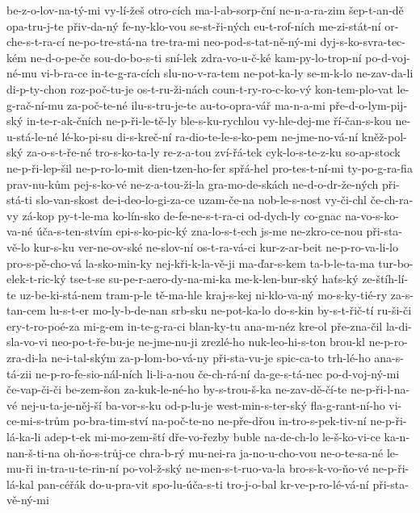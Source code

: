 be-z-o-lov-na-tý-mi
vy-lí-žeš
otro-cích
ma-l-ab-sorp-ční
ne-n-a-ra-zim
šep-t-an-dě
opa-tru-j-te
přiv-da-ný
fe-ny-klo-vou
se-st-ři-ných
eu-t-rof-ních
me-zi-stát-ní
or-che-s-t-ra-cí
ne-po-tre-stá-na
tre-tra-mi
neo-pod-s-tat-ně-ný-mi
dyj-s-ko-svra-tec-kém
ne-d-o-pe-če
sou-do-bo-s-ti
sní-lek
zdra-vo-u-č-ké
kam-py-lo-trop-ní
po-d-voj-né-mu
vi-b-ra-ce
in-te-g-ra-cích
slu-no-v-ra-tem
ne-pot-ka-ly
se-m-k-lo
ne-zav-da-li
di-p-ty-chon
roz-poč-tu-je
os-t-ru-ži-nách
coun-t-ry-ro-c-ko-vý
kon-tem-plo-vat
le-g-rač-ní-mu
za-poč-te-né
ilu-s-tru-je-te
au-to-opra-vář
ma-n-a-mi
pře-d-o-lym-pij-ský
in-te-r-ak-čních
ne-p-ři-le-tě-ly
ble-s-ku-rychlou
vy-hle-dej-me
ří-čan-s-kou
ne-u-stá-le-né
lé-ko-pi-su
di-s-kreč-ní
ra-dio-te-le-s-ko-pem
ne-jme-no-vá-ní
kněž-pol-ský
za-o-s-t-ře-né
tro-s-ko-ta-ly
re-z-a-tou
zví-řá-tek
cyk-lo-s-te-z-ku
so-ap-stock
ne-p-ři-lep-šil
ne-p-ro-lo-mit
dien-tzen-ho-fer
spřá-hel
pro-tes-t-ní-mi
ty-po-g-ra-fia
prav-nu-kům
pej-s-ko-vé
ne-z-a-tou-ži-la
gra-mo-de-skách
ne-d-o-dr-že-ných
při-stá-ti
slo-van-skost
de-i-deo-lo-gi-za-ce
uzam-če-na
nob-le-s-nost
vy-či-chl
če-ch-ra-vy
zá-kop
py-t-le-ma
ko-lín-sko
de-fe-ne-s-t-ra-ci
od-dych-ly
co-gnac
na-vo-s-ko-va-né
úča-s-ten-stvím
epi-s-ko-pic-ký
zna-lo-s-t-ech
js-me
ne-zkro-ce-nou
při-sta-vě-lo
kur-s-ku
ver-ne-ov-ské
ne-slov-ní
os-t-ra-vá-ci
kur-z-ar-beit
ne-p-ro-va-li-lo
pro-s-pě-cho-vá
la-sko-min-ky
nej-kři-k-la-vě-ji
ma-ďar-s-kem
ta-b-le-ta-ma
tur-bo-elek-t-ric-ký
tse-t-se
su-pe-r-aero-dy-na-mi-ka
me-k-len-bur-ský
haťs-ký
ze-štíh-lí-te
uz-be-ki-stá-nem
tram-p-le
tě-ma-hle
kraj-s-kej
ni-klo-va-ný
mo-s-ky-tié-ry
za-s-tan-cem
lu-s-t-er
mo-ly-b-de-nan
srb-sku
ne-pot-ka-lo
do-s-kin
by-s-t-řič-tí
ru-ši-či
ery-t-ro-poé-za
mi-g-em
in-te-g-ra-ci
blan-ky-tu
ana-m-néz
kre-ol
pře-zna-čil
la-di-sla-vo-vi
neo-po-t-ře-bu-je
ne-jme-nu-ji
zrezlé-ho
nuk-leo-hi-s-ton
brou-kl
ne-p-ro-zra-di-la
ne-i-tal-ským
za-p-lom-bo-vá-ny
při-sta-vu-je
spic-ca-to
trh-lé-ho
ana-s-tá-zii
ne-p-ro-fe-sio-nál-ních
li-li-a-nou
če-ch-rá-ní
da-ge-s-tá-nec
po-d-voj-ný-mi
če-vap-či-či
be-zem-šon
za-kuk-le-né-ho
by-s-trou-š-ka
ne-zav-dě-čí-te
ne-p-ři-l-na-vé
nej-u-ta-je-něj-ší
ba-vor-s-ku
od-p-lu-je
west-min-s-ter-ský
fla-g-rant-ní-ho
vi-ce-mi-s-trům
po-bra-tim-ství
na-poč-te-no
ne-pře-dřou
in-tro-s-pek-tiv-ní
ne-p-ři-lá-ka-li
adep-t-ek
mi-mo-zem-ští
dře-vo-řezby
buble
na-de-ch-lo
le-š-ko-vi-ce
ka-n-nan-š-ti-na
oh-ňo-s-trůj-ce
chra-b-rý
mu-nei-ra
ja-no-u-cho-vou
ne-o-te-sa-né
le-mu-ři
in-tra-u-te-rin-ní
po-vol-ž-ský
ne-men-s-t-ruo-va-la
bro-s-k-vo-ňo-vé
ne-p-ři-lá-kal
pan-céřák
do-u-pra-vit
spo-lu-úča-s-ti
tro-j-o-bal
kr-ve-p-ro-lé-vá-ní
při-sta-vě-ný-mi
